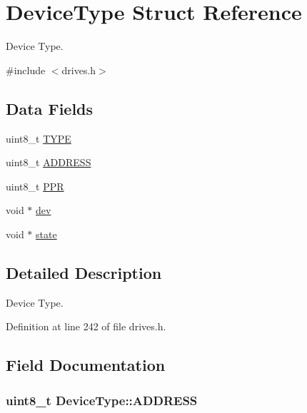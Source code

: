 \hypertarget{structDeviceType}{}\section{Device\+Type Struct Reference}
\label{structDeviceType}


Device Type.  




{\ttfamily \#include $<$drives.\+h$>$}

\subsection*{Data Fields}
\begin{DoxyCompactItemize}
\item 
uint8\+\_\+t \hyperlink{structDeviceType_acee5219162b6f47a9423b2086d127ede}{T\+Y\+PE}
\item 
uint8\+\_\+t \hyperlink{structDeviceType_a62529b7435785e39e8e7c5019303c2dd}{A\+D\+D\+R\+E\+SS}
\item 
uint8\+\_\+t \hyperlink{structDeviceType_ae0e59c6c17582ff80bdab3f2010e8d57}{P\+PR}
\item 
void $\ast$ \hyperlink{structDeviceType_a59fc3b3cb45f8ee0cd1016bd64804d3b}{dev}
\item 
void $\ast$ \hyperlink{structDeviceType_ad0fc43d63606bab6c259047e36512e08}{state}
\end{DoxyCompactItemize}


\subsection{Detailed Description}
Device Type. 

Definition at line 242 of file drives.\+h.



\subsection{Field Documentation}
\subsubsection[{\texorpdfstring{A\+D\+D\+R\+E\+SS}{ADDRESS}}]{\setlength{\rightskip}{0pt plus 5cm}uint8\+\_\+t Device\+Type\+::\+A\+D\+D\+R\+E\+SS}\hypertarget{structDeviceType_a62529b7435785e39e8e7c5019303c2dd}{}\label{structDeviceType_a62529b7435785e39e8e7c5019303c2dd}


